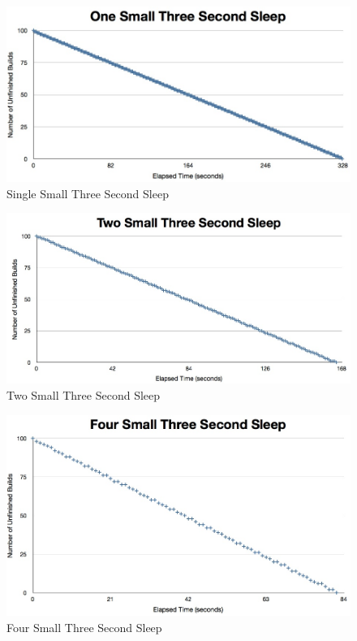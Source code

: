 \documentclass{scrartcl}
\begin{document}
\begin{figure}[here]
  \begin{center}
    \includegraphics[scale=0.45]{raw_data/sleep3/one_small/graph.jpg}
  \end{center}
  \caption{Single Small Three Second Sleep}
  \label{fig:sleep3_one_small_queuelength}
\end{figure}

\begin{figure}[here]
  \begin{center}
    \includegraphics[scale=0.45]{raw_data/sleep3/two_small/graph.jpg}
  \end{center}
  \caption{Two Small Three Second Sleep}
  \label{fig:sleep3_two_small_queuelength}
\end{figure}

\begin{figure}[here]
  \begin{center}
    \includegraphics[scale=0.45]{raw_data/sleep3/four_small/graph.jpg}
  \end{center}
  \caption{Four Small Three Second Sleep}
  \label{fig:sleep3_four_small_queuelength}
\end{figure}
\end{document}
